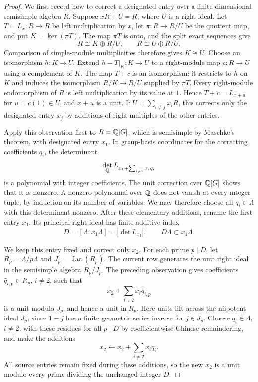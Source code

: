 \begin{proof}
We first record how to correct a designated entry over a
finite-dimensional semisimple algebra $R$.  Suppose $xR+U=R$, where
$U$ is a right ideal.  Let $T=L_x:R\to R$ be left multiplication by
$x$, let $\pi:R\to R/U$ be the quotient map, and put
$K=\ker(\pi T)$.  The map $\pi T$ is onto, and the split exact
sequences give
\[
  R\cong K\oplus R/U,
  \qquad R\cong U\oplus R/U.
\]
Comparison of simple-module multiplicities therefore gives $K\cong U$.
Choose an isomorphism $h:K\to U$.  Extend
$h-T|_K:K\to U$ to a right-module map $c:R\to U$ using a complement
of $K$.  The map $T+c$ is an isomorphism: it restricts to $h$ on $K$
and induces the isomorphism $R/K\to R/U$ supplied by $\pi T$.
Every right-module endomorphism of $R$ is left multiplication by its
value at $1$.  Hence $T+c=L_{x+u}$ for $u=c(1)\in U$, and $x+u$ is
a unit.  If $U=\sum_{i\ne j}x_iR$, this corrects only the designated
entry $x_j$ by additions of right multiples of the other entries.

Apply this observation first to $R=\mathbb Q[G]$, which is semisimple by
Maschke's theorem, with designated entry $x_1$.  In group-basis
coordinates for the correcting coefficients $q_i$, the determinant
\[
  \det_{\mathbb Q} L_{x_1+\sum_{i\ne1}x_iq_i}
\]
is a polynomial with integer coefficients.  The unit correction over
$\mathbb Q[G]$ shows that it is nonzero.  A nonzero polynomial over $\mathbb Q$
does not vanish at every integer tuple, by induction on its number of
variables.  We may therefore choose all $q_i\in\Lambda$ with this
determinant nonzero.  After these elementary additions, rename the
first entry $x_1$.  Its principal right ideal has finite additive index
\[
  D=[\Lambda:x_1\Lambda]=|\det L_{x_1}|,
  \qquad D\Lambda\subset x_1\Lambda.
\]

We keep this entry fixed and correct only $x_2$.  For each prime
$p\mid D$, let $R_p=\Lambda/p\Lambda$ and
$J_p=\operatorname{Jac}(R_p)$.  The current row generates the unit
right ideal in the semisimple algebra $R_p/J_p$.  The preceding
observation gives coefficients $\bar q_{i,p}\in R_p$, $i\ne2$, such
that
\[
  \bar x_2+\sum_{i\ne2}\bar x_i\bar q_{i,p}
\]
is a unit modulo $J_p$, and hence a unit in $R_p$.  Here units lift
across the nilpotent ideal $J_p$, since $1-j$ has a finite geometric
series inverse for $j\in J_p$.  Choose $q_i\in\Lambda$, $i\ne2$,
with these residues for all $p\mid D$ by coefficientwise Chinese
remaindering, and make the additions
\[
  x_2\longleftarrow x_2+\sum_{i\ne2}x_iq_i.
\]
All source entries remain fixed during these additions, so the new
$x_2$ is a unit modulo every prime dividing the unchanged integer $D$.


\end{proof}
